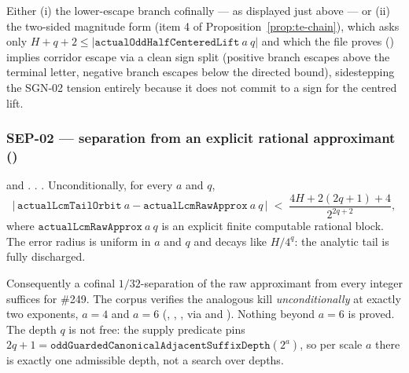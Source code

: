 \begin{prop}
Either (i) the lower-escape branch cofinally --- as displayed just above --- or (ii) the two-sided
magnitude form 
(item 4 of Proposition~\ref{prop:te-chain}), which asks only $H{+}q{+}2 \le
|\mathtt{actualOddHalfCenteredLift}\ a\ q|$ and which the file proves
()
implies corridor escape via a clean sign split (positive branch escapes above the terminal letter,
negative branch escapes below the directed bound), sidestepping the SGN-02 tension entirely because
it does not commit to a sign for the centred lift.
\end{prop}

\subsubsection{SEP-02 --- separation from an explicit rational approximant ()}

\begin{thm}
 and
.
. . Unconditionally, for every $a$ and $q$,
\[
  \bigl|\, \mathtt{actualLcmTailOrbit}\ a - \mathtt{actualLcmRawApprox}\ a\ q \,\bigr|
  \;<\; \frac{4H + 2(2q{+}1) + 4}{2^{2q+2}} ,
\]
where $\mathtt{actualLcmRawApprox}\ a\ q$ is an explicit finite computable rational block. The
error radius is uniform in $a$ and $q$ and decays like $H/4^q$: the analytic tail is fully
discharged.
\end{thm}

\begin{rem}
Consequently a cofinal $1/32$-separation of the raw approximant from every integer suffices for
\#249. The corpus verifies the analogous kill \emph{unconditionally} at exactly two exponents,
$a=4$ and $a=6$
(, ,
, via  and
). Nothing beyond
$a=6$ is proved. The depth $q$ is not free: the supply predicate pins $2q{+}1 =
\mathtt{oddGuardedCanonicalAdjacentSuffixDepth}(2^a)$, so per scale $a$ there is exactly one
admissible depth, not a search over depths.
\end{rem}

